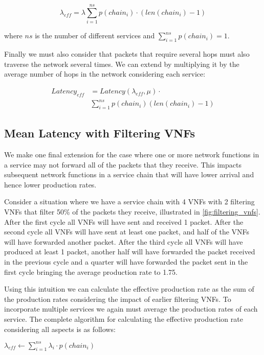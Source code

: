 \begin{equation}
\lambda_{eff} = \lambda \sum_{i=1}^{ns} p(chain_i) \cdot (len(chain_i) - 1)
\end{equation}

where $ns$ is the number of different services and $\sum_{i=1}^{ns} p(chain_i) = 1$.

Finally we must also consider that packets that require several hops must also traverse the network several times. We can extend  by multiplying it by the average number of hops in the network considering each service:

\begin{equation}
\label{eq:latency_eff}
\begin{split}
Latency_{eff} &= Latency(\lambda_{eff}, \mu) \cdot \\
			  &\sum_{i=1}^{ns} p(chain_i) (len(chain_i) - 1)
\end{split}
\end{equation}

\subsection{Mean Latency with Filtering VNFs}
We make one final extension for the case where one or more network functions in a service may not forward all of the packets that they receive. This impacts subsequent network functions in a service chain that will have lower arrival and hence lower production rates. 

Consider a situation where we have a service chain with 4 VNFs with 2 filtering VNFs that filter 50\% of the packets they receive, illustrated in \ref{fig:filtering_vnfs}. After the first cycle all VNFs will have sent and received 1 packet. After the second cycle all VNFs will have sent at least one packet, and half of the VNFs will have forwarded another packet. After the third cycle all VNFs will have produced at least 1 packet, another half will have forwarded the packet received in the previous cycle and a quarter will have forwarded the packet sent in the first cycle bringing the average production rate to 1.75.

Using this intuition we can calculate the effective production rate as the sum of the production rates considering the impact of earlier filtering VNFs. To incorporate multiple services we again must average the production rates of each service. The complete algorithm for calculating the effective production rate considering all aspects is as follows:

\begin{algorithmic}[1]

\ENDFOR

\STATE $\lambda_{eff} \leftarrow \sum_{i=1}^{ns} \lambda_i \cdot p(chain_i)$

\end{algorithmic}